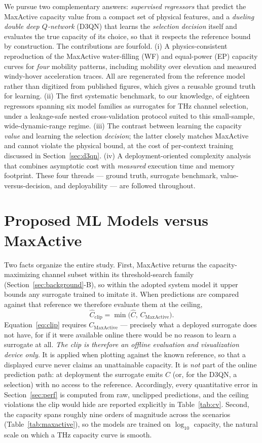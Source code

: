 \documentclass[journal]{IEEEtran}
\begin{document}
We pursue two complementary answers: \emph{supervised regressors} that predict the
MaxActive capacity value from a compact set of physical features, and a \emph{dueling
double deep $Q$-network} (D3QN) that learns the \emph{selection decision} itself and
evaluates the true capacity of its choice, so that it respects the reference bound by
construction. The contributions are fourfold.
(i) A physics-consistent reproduction of the MaxActive water-filling (WF) and equal-power
(EP) capacity curves for \emph{four} mobility patterns, including mobility over elevation
and measured windy-hover acceleration traces. All are regenerated from the reference model
rather than digitized from published figures, which gives a reusable ground truth for
learning.
(ii) The first systematic benchmark, to our knowledge, of eighteen regressors spanning six
model families as surrogates for THz channel selection, under a leakage-safe nested
cross-validation protocol suited to this small-sample, wide-dynamic-range regime.
(iii) The contrast between learning the capacity \emph{value} and learning the selection
\emph{decision}; the latter closely matches MaxActive and cannot violate the physical
bound, at the cost of per-context training discussed in Section~\ref{sec:d3qn}.
(iv) A deployment-oriented complexity analysis that combines asymptotic cost with
\emph{measured} execution time and memory footprint.
These four threads --- ground truth, surrogate benchmark, value-versus-decision, and
deployability --- are followed throughout.

\section{Proposed ML Models versus MaxActive}
\label{sec:proposed}
Two facts organize the entire study. First, MaxActive returns the capacity-maximizing
channel subset within its threshold-search family (Section~\ref{sec:background}-B), so
within the adopted system model it upper bounds any surrogate trained to imitate it. When
predictions are compared against that reference we therefore evaluate them at the ceiling,
\begin{equation}
\hat{C}_{\text{clip}}=\min\!\big(\hat{C},\,C_{\text{MaxActive}}\big).
\label{eq:clip}
\end{equation}
Equation~\eqref{eq:clip} requires $C_{\text{MaxActive}}$ --- precisely what a deployed
surrogate does not have, for if it were available online there would be no reason to learn
a surrogate at all. \emph{The clip is therefore an offline evaluation and visualization
device only}. It is applied when plotting against the known reference, so that a displayed
curve never claims an unattainable capacity. It is \emph{not} part of the online
prediction path: at deployment the surrogate emits $\hat{C}$ (or, for the D3QN, a
selection) with no access to the reference. Accordingly, every quantitative error in
Section~\ref{sec:perf} is computed from raw, unclipped predictions, and the ceiling
violations the clip would hide are reported explicitly in Table~\ref{tab:cv}. Second, the
capacity spans roughly nine orders of magnitude across the scenarios
(Table~\ref{tab:maxactive}), so the models are trained on $\log_{10}$ capacity, the
natural scale on which a THz capacity curve is smooth.
\end{document}
